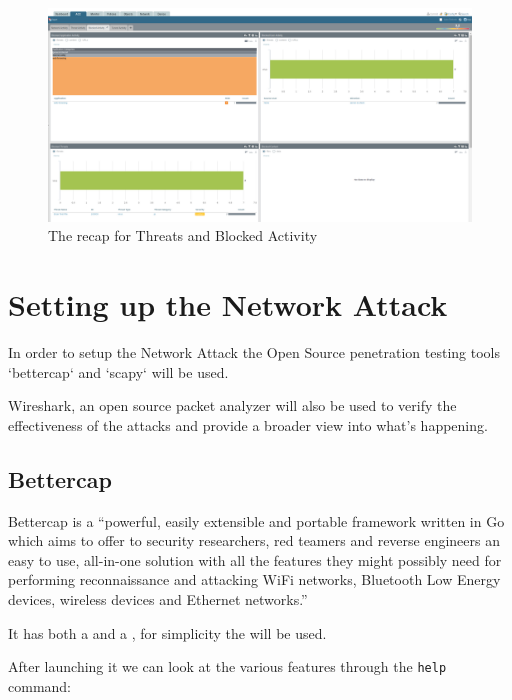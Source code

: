 \begin{figure}[h!]
 \centering
 \includegraphics[width=13.5cm]{img/acc.png}
 \caption{The  recap for Threats and Blocked Activity}
 \label{fig: acc}
\end{figure}


\newpage

\section{Setting up the Network Attack}

In order to setup the Network Attack the Open Source penetration testing tools `bettercap`\cite{bettercap} and `scapy`\cite{scapy} will be used.

Wireshark\cite{wireshark}, an open source packet analyzer will also be used to verify the effectiveness of the attacks and provide a broader view into what's happening.

\subsection{Bettercap}

Bettercap is a ``powerful, easily extensible and portable framework written in Go which aims to offer to security researchers, red teamers and reverse engineers an easy to use, all-in-one solution with all the features they might possibly need for performing reconnaissance and attacking WiFi networks, Bluetooth Low Energy devices, wireless  devices and Ethernet networks.''\cite{bettercap}

It has both a  and a , for simplicity the  will be used.

After launching it we can look at the various features through the \verb|help| command:

